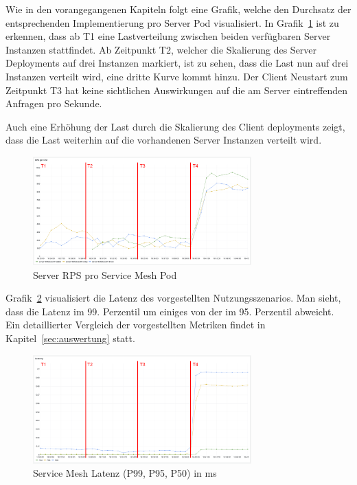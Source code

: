 Wie in den vorangegangenen Kapiteln folgt eine Grafik, welche den Durchsatz der entsprechenden Implementierung pro Server Pod visualisiert.
In Grafik~\ref{fig:mesh_rps} ist zu erkennen, dass ab T1 eine Lastverteilung zwischen beiden verfügbaren Server Instanzen stattfindet.
Ab Zeitpunkt T2, welcher die Skalierung des Server Deployments auf drei Instanzen markiert, ist zu sehen, dass die Last nun auf drei Instanzen verteilt wird, eine dritte Kurve kommt hinzu.
Der Client Neustart zum Zeitpunkt T3 hat keine sichtlichen Auswirkungen auf die am Server eintreffenden Anfragen pro Sekunde.

Auch eine Erhöhung der Last durch die Skalierung des Client deployments zeigt, dass die Last weiterhin auf die vorhandenen Server Instanzen verteilt wird.

\begin{figure}[H]
    \centering
    \includegraphics[width=0.75\textwidth]{img/mesh_rps}
    \caption{Server RPS pro Service Mesh Pod}
    \label{fig:mesh_rps}
\end{figure}

Grafik~\ref{fig:mesh_latenz} visualisiert die Latenz des vorgestellten Nutzungsszenarios.
Man sieht, dass die Latenz im 99. Perzentil um einiges von der im 95. Perzentil abweicht.
Ein detaillierter Vergleich der vorgestellten Metriken findet in Kapitel~\ref{sec:auswertung} statt.

\begin{figure}[H]
    \centering
    \includegraphics[width=0.75\textwidth]{img/mesh_latenz}
    \caption{Service Mesh Latenz (P99, P95, P50) in ms}
    \label{fig:mesh_latenz}
\end{figure}

